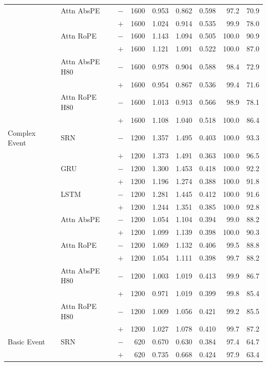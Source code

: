 \begin{table}[t]
\begin{tabular}{@{}lllrrrrrr@{}}
 & Attn AbsPE & $-$ & 1600 & 0.953 & 0.862 & 0.598 & 97.2 & 70.9 \\
 &  & $+$ & 1600 & 1.024 & 0.914 & 0.535 & 99.9 & 78.0 \\
\addlinespace[1pt]
 & Attn RoPE & $-$ & 1600 & 1.143 & 1.094 & 0.505 & 100.0 & 90.9 \\
 &  & $+$ & 1600 & 1.121 & 1.091 & 0.522 & 100.0 & 87.0 \\
\addlinespace[1pt]
 & Attn AbsPE H80 & $-$ & 1600 & 0.978 & 0.904 & 0.588 & 98.4 & 72.9 \\
 &  & $+$ & 1600 & 0.954 & 0.867 & 0.536 & 99.4 & 71.6 \\
\addlinespace[1pt]
 & Attn RoPE H80 & $-$ & 1600 & 1.013 & 0.913 & 0.566 & 98.9 & 78.1 \\
 &  & $+$ & 1600 & 1.108 & 1.040 & 0.518 & 100.0 & 86.4 \\
\addlinespace
Complex Event & SRN & $-$ & 1200 & 1.357 & 1.495 & 0.403 & 100.0 & 93.3 \\
 &  & $+$ & 1200 & 1.373 & 1.491 & 0.363 & 100.0 & 96.5 \\
\addlinespace[1pt]
 & GRU & $-$ & 1200 & 1.300 & 1.453 & 0.418 & 100.0 & 92.2 \\
 &  & $+$ & 1200 & 1.196 & 1.274 & 0.388 & 100.0 & 91.8 \\
\addlinespace[1pt]
 & LSTM & $-$ & 1200 & 1.281 & 1.445 & 0.412 & 100.0 & 91.6 \\
 &  & $+$ & 1200 & 1.244 & 1.351 & 0.385 & 100.0 & 92.8 \\
\addlinespace[1pt]
 & Attn AbsPE & $-$ & 1200 & 1.054 & 1.104 & 0.394 & 99.0 & 88.2 \\
 &  & $+$ & 1200 & 1.099 & 1.139 & 0.398 & 100.0 & 90.3 \\
\addlinespace[1pt]
 & Attn RoPE & $-$ & 1200 & 1.069 & 1.132 & 0.406 & 99.5 & 88.8 \\
 &  & $+$ & 1200 & 1.054 & 1.111 & 0.398 & 99.7 & 88.2 \\
\addlinespace[1pt]
 & Attn AbsPE H80 & $-$ & 1200 & 1.003 & 1.019 & 0.413 & 99.9 & 86.7 \\
 &  & $+$ & 1200 & 0.971 & 1.019 & 0.399 & 99.8 & 85.4 \\
\addlinespace[1pt]
 & Attn RoPE H80 & $-$ & 1200 & 1.009 & 1.056 & 0.421 & 99.2 & 85.5 \\
 &  & $+$ & 1200 & 1.027 & 1.078 & 0.410 & 99.7 & 87.2 \\
\addlinespace
Basic Event & SRN & $-$ & 620 & 0.670 & 0.630 & 0.384 & 97.4 & 64.7 \\
 &  & $+$ & 620 & 0.735 & 0.668 & 0.424 & 97.9 & 63.4 \\

\end{tabular}
\end{table}
